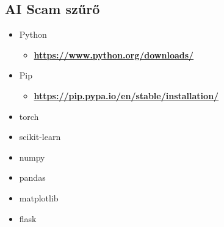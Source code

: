 \subsection{AI Scam szűrő}
\begin{itemize}
    \item Python
    \begin{itemize}
        \item \textbf{\href{https://www.python.org/downloads/}{https://www.python.org/downloads/}}
    \end{itemize}
    \item Pip
    \begin{itemize}
        \item \textbf{\href{https://pip.pypa.io/en/stable/installation/}{https://pip.pypa.io/en/stable/installation/}}
    \end{itemize}
    \item torch
    \item scikit-learn
    \item numpy
    \item pandas
    \item matplotlib
    \item flask
\end{itemize}